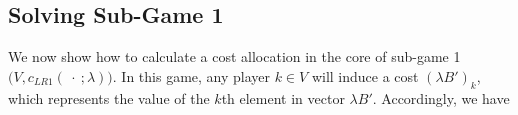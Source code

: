 \documentclass[ijoc,nonblindrev]{informs3} %
\begin{document}
%
%
%

\subsection{Solving Sub-Game 1}	
We now show how to calculate a cost allocation in the core of sub-game 1 $\big(V,c_{LR1}(\ \cdot\ ;\lambda)\big)$.
In this game, any player $k \in V $ will induce a cost $(\lambda B')_k$, which represents the value of the $k$th element in vector $\lambda B'$. Accordingly, we have 
\end{document}
